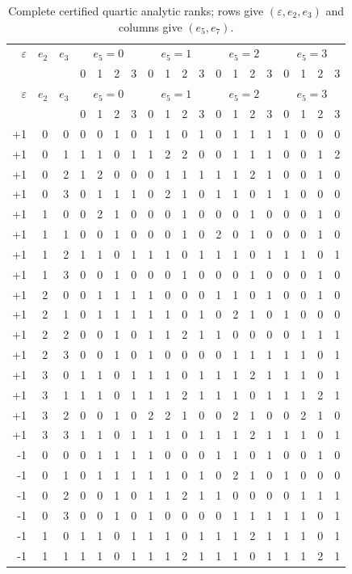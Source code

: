 {
\scriptsize
\setlength{\tabcolsep}{2pt}
\begin{longtable}{rrr|rrrr|rrrr|rrrr|rrrr}
\caption{Complete certified quartic analytic ranks; rows give $(\varepsilon,e_2,e_3)$ and columns give $(e_5,e_7)$.}\\
\toprule
$\varepsilon$&$e_2$&$e_3$&\multicolumn{4}{c}{$e_5=0$}&\multicolumn{4}{c}{$e_5=1$}&\multicolumn{4}{c}{$e_5=2$}&\multicolumn{4}{c}{$e_5=3$}\\
&&&0&1&2&3&0&1&2&3&0&1&2&3&0&1&2&3\\
\midrule
\endfirsthead
\toprule
$\varepsilon$&$e_2$&$e_3$&\multicolumn{4}{c}{$e_5=0$}&\multicolumn{4}{c}{$e_5=1$}&\multicolumn{4}{c}{$e_5=2$}&\multicolumn{4}{c}{$e_5=3$}\\
&&&0&1&2&3&0&1&2&3&0&1&2&3&0&1&2&3\\
\midrule
\endhead
\bottomrule\endfoot
+1&0&0&0&0&1&0&1&1&0&1&0&1&1&1&1&0&0&0\\
+1&0&1&1&1&0&1&1&2&2&0&0&1&1&1&0&0&1&2\\
+1&0&2&1&2&0&0&0&1&1&1&1&1&2&1&0&0&1&0\\
+1&0&3&0&1&1&1&0&2&1&0&1&1&0&1&1&0&0&0\\
+1&1&0&0&2&1&0&0&0&1&0&0&0&1&0&0&0&1&0\\
+1&1&1&0&0&1&0&0&0&1&0&2&0&1&0&0&0&1&0\\
+1&1&2&1&1&0&1&1&1&0&1&1&1&0&1&1&1&0&1\\
+1&1&3&0&0&1&0&0&0&1&0&0&0&1&0&0&0&1&0\\
+1&2&0&0&1&1&1&1&0&0&0&1&1&0&1&0&0&1&0\\
+1&2&1&0&1&1&1&1&1&0&1&0&2&1&0&1&0&0&0\\
+1&2&2&0&0&1&0&1&1&2&1&1&0&0&0&0&1&1&1\\
+1&2&3&0&0&1&0&1&0&0&0&0&1&1&1&1&1&0&1\\
+1&3&0&1&1&0&1&1&1&0&1&1&1&2&1&1&1&0&1\\
+1&3&1&1&1&0&1&1&1&2&1&1&1&0&1&1&1&2&1\\
+1&3&2&0&0&1&0&2&2&1&0&0&2&1&0&0&2&1&0\\
+1&3&3&1&1&0&1&1&1&0&1&1&1&2&1&1&1&0&1\\
-1&0&0&0&1&1&1&1&0&0&0&1&1&0&1&0&0&1&0\\
-1&0&1&0&1&1&1&1&1&0&1&0&2&1&0&1&0&0&0\\
-1&0&2&0&0&1&0&1&1&2&1&1&0&0&0&0&1&1&1\\
-1&0&3&0&0&1&0&1&0&0&0&0&1&1&1&1&1&0&1\\
-1&1&0&1&1&0&1&1&1&0&1&1&1&2&1&1&1&0&1\\
-1&1&1&1&1&0&1&1&1&2&1&1&1&0&1&1&1&2&1\\

\end{longtable}}
